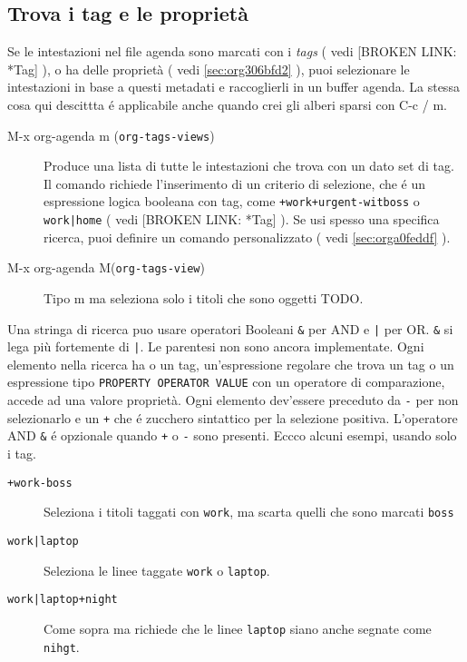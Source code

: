 \documentclass[11pt]{article}
\begin{document}
\subsection{Trova i tag e le proprietà}
\label{sec:org17b9282}
Se le intestazioni nel file agenda sono marcati con i \emph{tags} ( vedi
[BROKEN LINK: *Tag] ), o ha delle proprietà ( vedi \ref{sec:org306bfd2} ), puoi selezionare le
intestazioni in base a questi metadati e raccoglierli in un buffer
agenda. La stessa cosa qui descittta é applicabile anche quando crei
gli alberi sparsi con C-c / m.

\begin{description}
\item[{M-x org-agenda m (\texttt{org-tags-views})}] Produce una lista di tutte le intestazioni che trova con un dato set
di tag. Il comando richiede l'inserimento di un criterio di
selezione, che é un espressione logica booleana con tag, come
\texttt{+work+urgent-witboss} o \texttt{work|home} ( vedi [BROKEN LINK: *Tag] ). Se usi spesso
una specifica ricerca, puoi definire un comando personalizzato (
vedi \ref{sec:orga0feddf} ).

\item[{M-x org-agenda M(\texttt{org-tags-view})}] Tipo m ma seleziona solo i titoli che sono oggetti TODO.
\end{description}

Una stringa di ricerca puo usare operatori Booleani \texttt{\&} per AND e \texttt{|}
per OR. \texttt{\&} si lega più fortemente di \texttt{|}. Le parentesi non sono
ancora implementate. Ogni elemento nella ricerca ha o un tag,
un'espressione regolare che trova un tag o un espressione tipo
\texttt{PROPERTY OPERATOR VALUE} con un operatore di comparazione, accede ad
una valore proprietà. Ogni elemento dev'essere preceduto da \texttt{-} per
non selezionarlo e un \texttt{+} che é zucchero sintattico per la selezione
positiva. L'operatore AND \texttt{\&} é opzionale quando \texttt{+} o \texttt{-} sono
presenti. Eccco alcuni esempi, usando solo i tag.

\begin{description}
\item[{\texttt{+work-boss}}] Seleziona i titoli taggati con \texttt{work}, ma scarta quelli che sono
marcati \texttt{boss}

\item[{\texttt{work|laptop}}] Seleziona le linee taggate \texttt{work} o \texttt{laptop}.

\item[{\texttt{work|laptop+night}}] Come sopra ma richiede che le linee \texttt{laptop} siano anche segnate
come \texttt{nihgt}.
\end{description}
\end{document}
